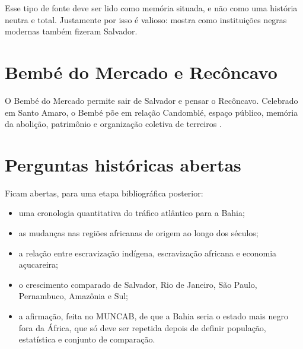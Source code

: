 Esse tipo de fonte deve ser lido como memória
situada, e não como uma história
neutra e total. Justamente por isso é
valioso: mostra como instituições negras
modernas também fizeram Salvador.

\section{Bembé do Mercado e Recôncavo}
\label{section-historia-bembe}

O Bembé do Mercado permite sair de
Salvador e pensar o Recôncavo. Celebrado em Santo Amaro, o
Bembé põe em relação Candomblé,
espaço público, memória da abolição,
patrimônio e organização coletiva de
terreiros \cite{ufrb2026bembe}.

\section{Perguntas históricas abertas}
\label{section-historia-salvador-open}

Ficam abertas, para uma etapa bibliográfica
posterior:
\begin{itemize}
\item uma cronologia quantitativa do tráfico
      atlântico para a Bahia;
\item as mudanças nas regiões africanas de
      origem ao longo dos séculos;
\item a relação entre escravização indígena,
      escravização africana e economia
açucareira;
\item o crescimento comparado de Salvador,
      Rio de Janeiro, São Paulo,
Pernambuco, Amazônia e Sul;
\item a afirmação, feita no MUNCAB, de que a
      Bahia seria o estado mais negro
fora da África, que só deve ser repetida
depois de definir população,
estatística e conjunto de comparação.
\end{itemize}






